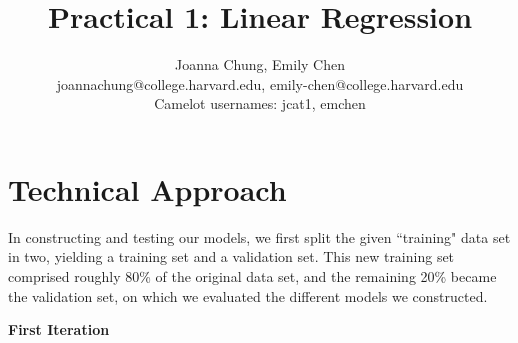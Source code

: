 \documentclass[11pt]{article}
\title{Practical 1: Linear Regression}
\author{Joanna Chung, Emily Chen \\ 
joannachung@college.harvard.edu, emily-chen@college.harvard.edu \\
Camelot usernames: jcat1, emchen}
\begin{document}
\maketitle{}


\section{Technical Approach}
  In constructing and testing our models, we first split the given ``training" data set in two, yielding a training set and a validation set. This new training set comprised roughly 80\% of the original data set, and the remaining 20\% became the validation set, on which we evaluated the different models we constructed. \\
  
  \begin{center}
      \textbf{First Iteration}
  \end{center}
  
\end{document}

